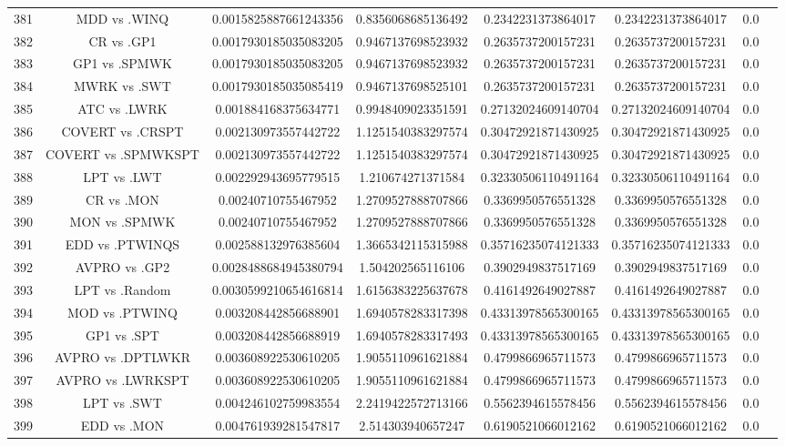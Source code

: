 \documentclass[a3paper,10pt]{article}
\begin{document}
\begin{table}[!htp]
\begin{tabular}{cccccccc}
381&MDD vs .WINQ&0.0015825887661243356&0.8356068685136492&0.2342231373864017&0.2342231373864017&0.0\\
382&CR vs .GP1&0.0017930185035083205&0.9467137698523932&0.2635737200157231&0.2635737200157231&0.0\\
383&GP1 vs .SPMWK&0.0017930185035083205&0.9467137698523932&0.2635737200157231&0.2635737200157231&0.0\\
384&MWRK vs .SWT&0.0017930185035085419&0.9467137698525101&0.2635737200157231&0.2635737200157231&0.0\\
385&ATC vs .LWRK&0.001884168375634771&0.9948409023351591&0.27132024609140704&0.27132024609140704&0.0\\
386&COVERT vs .CRSPT&0.002130973557442722&1.1251540383297574&0.30472921871430925&0.30472921871430925&0.0\\
387&COVERT vs .SPMWKSPT&0.002130973557442722&1.1251540383297574&0.30472921871430925&0.30472921871430925&0.0\\
388&LPT vs .LWT&0.002292943695779515&1.210674271371584&0.32330506110491164&0.32330506110491164&0.0\\
389&CR vs .MON&0.00240710755467952&1.2709527888707866&0.3369950576551328&0.3369950576551328&0.0\\
390&MON vs .SPMWK&0.00240710755467952&1.2709527888707866&0.3369950576551328&0.3369950576551328&0.0\\
391&EDD vs .PTWINQS&0.002588132976385604&1.3665342115315988&0.35716235074121333&0.35716235074121333&0.0\\
392&AVPRO vs .GP2&0.0028488684945380794&1.504202565116106&0.3902949837517169&0.3902949837517169&0.0\\
393&LPT vs .Random&0.0030599210654616814&1.6156383225637678&0.4161492649027887&0.4161492649027887&0.0\\
394&MOD vs .PTWINQ&0.003208442856688901&1.6940578283317398&0.43313978565300165&0.43313978565300165&0.0\\
395&GP1 vs .SPT&0.003208442856688919&1.6940578283317493&0.43313978565300165&0.43313978565300165&0.0\\
396&AVPRO vs .DPTLWKR&0.003608922530610205&1.9055110961621884&0.4799866965711573&0.4799866965711573&0.0\\
397&AVPRO vs .LWRKSPT&0.003608922530610205&1.9055110961621884&0.4799866965711573&0.4799866965711573&0.0\\
398&LPT vs .SWT&0.004246102759983554&2.2419422572713166&0.5562394615578456&0.5562394615578456&0.0\\
399&EDD vs .MON&0.004761939281547817&2.514303940657247&0.6190521066012162&0.6190521066012162&0.0\\

\end{tabular}
\end{table}
\end{document}

